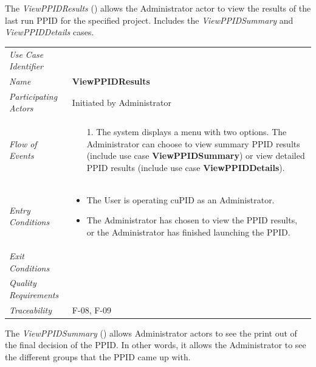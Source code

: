 \documentclass[12pt,letterpaper]{article}
\begin{document}
\vspace{1em}
The {\it ViewPPIDResults} () allows the Administrator actor to view the results of the last run PPID for the specified project. Includes the {\it ViewPPIDSummary} and {\it ViewPPIDDetails} cases.

\begin{center}
	\begin{tabu} to 
		\toprule
		Use Case Identifier &  \\
		Name & {\bf ViewPPIDResults} \\
		Participating Actors & Initiated by Administrator \\
		Flow of Events & 
		\begin{minipage}[t]{\linewidth}
		    \begin{enumerate}
		        \item[1.] The system displays a menu with two options. The Administrator can choose to view summary PPID results (include use case \textbf{ViewPPIDSummary}) or view detailed PPID results (include use case \textbf{ViewPPIDDetails}).
			\end{enumerate}
	    \end{minipage} \\

		Entry Conditions &
		\begin{minipage}[t]{\linewidth}
			\begin{itemize}
			    \item The User is operating cuPID as an Administrator.
			    \item The Administrator has chosen to view the PPID results, or the Administrator has finished launching the PPID.
	        \end{itemize}
	    \end{minipage} \\

		Exit Conditions & \\

		Quality Requirements & \\

		Traceability & F-08, F-09 \\
		\toprule
	\end{tabu}
\end{center}

\newpage{}

The {\it ViewPPIDSummary} () allows Administrator actors to see the print out of the final decision of the PPID. In other words, it allows the Administrator to see the different groups that the PPID came up with.
\end{document}
